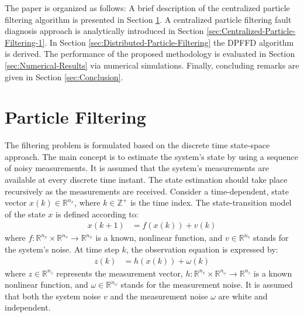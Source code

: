\documentclass[10pt,twocolumn,twoside]{IEEEtran}
\begin{document}
The paper is organized as follows: A brief description of the centralized
particle filtering algorithm is presented in Section \ref{sec:Centralized-Particle-Filtering}. A
centralized particle filtering fault diagnosis approach is analytically introduced in Section \ref{sec:Centralized-Particle-Filtering-1}. In Section \ref{sec:Distributed-Particle-Filtering} the DPFFD algorithm is derived. The performance of the proposed methodology is evaluated in Section \ref{sec:Numerical-Results} via numerical simulations. Finally, concluding remarks are given in Section \ref{sec:Conclusion}.

\section{Particle Filtering} \label{sec:Centralized-Particle-Filtering}

The filtering problem is formulated based on the discrete time state-space
approach. The main concept is to estimate the system's state by using
a sequence of noisy measurements. It is assumed that the system's
measurements are available at every discrete time instant. The state
estimation should take place recursively as the measurements are received.
Consider a time-dependent, state vector $x(k)\in\mathbb{R}^{n_{x}}$,
where $k\in\mathbb{Z}^{+}$ is the time index. The state-transition
model of the state $x$ is defined according to:
\begin{equation}
\begin{aligned}x(k+1) & =f(x(k))+v(k)\end{aligned}
\label{eq:state transition model}
\end{equation}
where $f:\mathbb{R}^{n_{x}}\times\mathbb{R}^{n_{v}}\rightarrow\mathbb{R}^{n_{x}}$
is a known, nonlinear function, and $v\in\mathbb{R}^{n_{v}}$ stands
for the system's noise. At time step $k$, the observation equation
is expressed by:
\begin{equation}
\begin{aligned}z(k) & =h(x(k))+\omega(k)\end{aligned}
\label{eq:local measurement model}
\end{equation}
where $z\in\mathbb{R}^{n_{z}}$ represents the measurement vector,
$h:\mathbb{R}^{n_{x}}\times\mathbb{R}^{n_{\omega}}\rightarrow\mathbb{R}^{n_{z}}$
is a known nonlinear function, and $\omega\in\mathbb{R}^{n_{\omega}}$
stands for the measurement noise. It is assumed that both the system
noise $v$ and the measurement noise $\omega$ are white and independent. 
\end{document}
